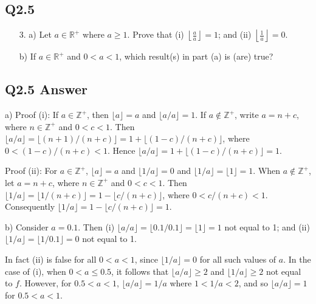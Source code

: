 \documentclass{article}
\begin{document}
\subsection*{Q2.5}
\begin{enumerate}
    \item[3. a)] Let \( a \in \mathbb{R}^+ \) where \( a \geq 1 \). Prove that (i) \( \left\lfloor \frac{a}{a} \right\rfloor = 1 \); and (ii) \( \left\lfloor \frac{1}{a} \right\rfloor = 0 \).
    \item[b)] If \( a \in \mathbb{R}^+ \) and \( 0 < a < 1 \), which result(s) in part (a) is (are) true?
\end{enumerate}
\newpage
{}
\subsection*{Q2.5 Answer}
a) Proof (i): If \( a \in \mathbb{Z}^+ \), then \( \lfloor a \rfloor = a \) and \( \lfloor a/a \rfloor = 1 \). If \( a \notin \mathbb{Z}^+ \), write \( a = n + c \), where \( n \in \mathbb{Z}^+ \) and \( 0 < c < 1 \). Then \( \lfloor a/a \rfloor = \lfloor (n + 1)/(n + c) \rfloor = 1 + \lfloor (1 - c)/(n + c) \rfloor \), where \( 0 < (1 - c)/(n + c) < 1 \). Hence \( \lfloor a/a \rfloor = 1 + \lfloor (1 - c)/(n + c) \rfloor = 1 \).

Proof (ii): For \( a \in \mathbb{Z}^+ \), \( \lfloor a \rfloor = a \) and \( \lfloor 1/a \rfloor = 0 \) and \( \lfloor 1/a \rfloor = \lfloor 1 \rfloor = 1 \). When \( a \notin \mathbb{Z}^+ \), let \( a = n + c \), where \( n \in \mathbb{Z}^+ \) and \( 0 < c < 1 \). Then \( \lfloor 1/a \rfloor = \lfloor 1/(n + c) \rfloor = 1 - \lfloor c/(n + c) \rfloor \), where \( 0 < c/(n + c) < 1 \). Consequently \( \lfloor 1/a \rfloor = 1 - \lfloor c/(n + c) \rfloor = 1 \).

b) Consider \( a = 0.1 \). Then
(i) \( \lfloor a/a \rfloor = \lfloor 0.1/0.1 \rfloor = \lfloor 1 \rfloor = 1 \) not equal to 1; and
(ii) \( \lfloor 1/a \rfloor = \lfloor 1/0.1 \rfloor = 0 \) not equal to 1.

In fact (ii) is false for all \( 0 < a < 1 \), since \( \lfloor 1/a \rfloor = 0 \) for all such values of \( a \). In the case of (i), when \( 0 < a \leq 0.5 \), it follows that \( \lfloor a/a \rfloor \geq 2 \) and \( \lfloor 1/a \rfloor \geq 2 \) not equal to \( f \). However, for \( 0.5 < a < 1 \), \( \lfloor a/a \rfloor = 1/a \) where \( 1 < 1/a < 2 \), and so \( \lfloor a/a \rfloor = 1 \) for \( 0.5 < a < 1 \).
\newpage
{}
\end{document}
